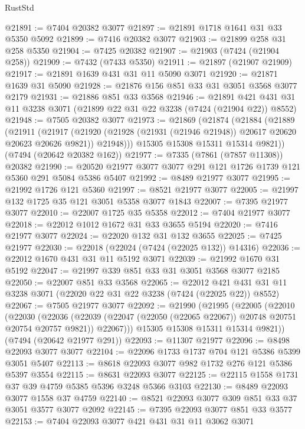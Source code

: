 \begin{lexlean}{RustStd}
\begin{coremodule}
@21891 := @7404 @20382 @3077
@21897 := @21891 @1718 @1641 @31 @33 @5350 @5092
@21899 := @7416 @20382 @3077
@21903 := @21899 @258 @31 @258 @5350
@21904 := @7425 @20382
@21907 := @21903 (@7424 (@21904 @258))
@21909 := @7432 (@7433 @5350)
@21911 := @21897 (@21907 @21909)
@21917 := @21891 @1639 @431 @31 @11 @5090 @3071
@21920 := @21871 @1639 @31 @5090
@21928 := @21876 @156 @851 @33 @31 @3051 @3568 @3077 @2179
@21931 := @21886 @851 @33 @3568
@21946 := @21891 @421 @431 @31 @11 @3238 @3071 (@21899 @22 @31 @22 @3238 (@7424 (@21904 @22)) @8552)
@21948 := @7505 @20382 @3077
@21973 := @21869
    (@21874
      (@21884
        (@21889
          (@21911
            (@21917
              (@21920 (@21928 (@21931 (@21946 @21948)) @20617 @20620 @20623 @20626 @9821))
              @21948)))
        @15305
        @15308
        @15311
        @15314
        @9821))
    (@7494 (@20642 @20382 @162))
@21977 := @7335 (@7861 (@7857 @11308)) @20382
@21990 := @20520 @21977 @3077 @3077 @291 @121 @1726 @1739 @121 @5360 @291 @5084 @5386 @5407
@21992 := @8489 @21977 @3077
@21995 := @21992 @1726 @121 @5360
@21997 := @8521 @21977 @3077
@22005 := @21997 @132 @1725 @35 @121 @3051 @5358 @3077 @1843
@22007 := @7395 @21977 @3077
@22010 := @22007 @1725 @35 @5358
@22012 := @7404 @21977 @3077
@22018 := @22012 @1012 @1672 @31 @33 @3655 @5194
@22020 := @7416 @21977 @3077
@22024 := @22020 @132 @31 @132 @3655
@22025 := @7425 @21977
@22030 := @22018 (@22024 (@7424 (@22025 @132)) @14316)
@22036 := @22012 @1670 @431 @31 @11 @5192 @3071
@22039 := @21992 @1670 @31 @5192
@22047 := @21997 @339 @851 @33 @31 @3051 @3568 @3077 @2185
@22050 := @22007 @851 @33 @3568
@22065 := @22012 @421 @431 @31 @11 @3238 @3071 (@22020 @22 @31 @22 @3238 (@7424 (@22025 @22)) @8552)
@22067 := @7505 @21977 @3077
@22092 := @21990
    (@21995
      (@22005
        (@22010
          (@22030
            (@22036
              (@22039 (@22047 (@22050 (@22065 @22067)) @20748 @20751 @20754 @20757 @9821))
              @22067)))
        @15305
        @15308
        @15311
        @15314
        @9821))
    (@7494 (@20642 @21977 @291))
@22093 := @11307 @21977
@22096 := @8498 @22093 @3077 @3077
@22104 := @22096 @1733 @1737 @704 @121 @5386 @5399 @3051 @5407
@22113 := @8618 @22093 @3077 @982 @1732 @276 @121 @5386 @5397 @3554
@22115 := @8631 @22093 @3077
@22125 := @22115 @1558 @1731 @37 @39 @4759 @5385 @5396 @3248 @5366 @3103
@22130 := @8489 @22093 @3077 @1558 @37 @4759
@22140 := @8521 @22093 @3077 @309 @851 @33 @37 @3051 @3577 @3077 @2092
@22145 := @7395 @22093 @3077 @851 @33 @3577
@22153 := @7404 @22093 @3077 @421 @431 @31 @11 @3062 @3071

\end{coremodule}
\end{lexlean}
